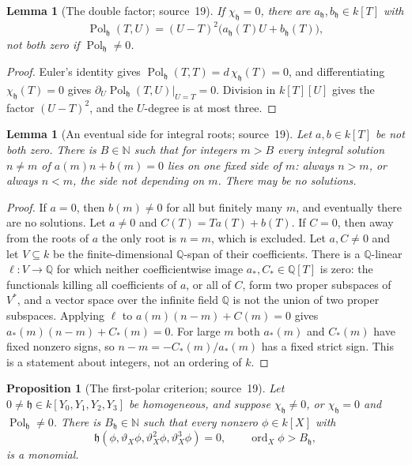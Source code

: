 \documentclass[11pt]{article}
\numberwithin{equation}{section}
\newtheorem{lemma}[theorem]{Lemma}
\newtheorem{proposition}[theorem]{Proposition}
\theoremstyle{definition}
\theoremstyle{remark}
\newcommand{\Q}{\mathbb Q}
\newcommand{\N}{\mathbb N}
\begin{document}
\begin{lemma}[The double factor; source~19]\label{hol:nr:lem:polar}
If $\chi_{\mathfrak h}=0$, there are $a_{\mathfrak h},b_{\mathfrak h}\in k[T]$
with
\begin{equation}\label{hol:nr:eq:polarfactor}
 \operatorname{Pol}_{\mathfrak h}(T,U)=(U-T)^2\bigl(a_{\mathfrak h}(T)U
 +b_{\mathfrak h}(T)\bigr),
\end{equation}
not both zero if $\operatorname{Pol}_{\mathfrak h}\ne0$.
\end{lemma}

\begin{proof}
Euler's identity gives $\operatorname{Pol}_{\mathfrak h}(T,T)=
d\,\chi_{\mathfrak h}(T)=0$, and differentiating $\chi_{\mathfrak h}(T)=0$ gives
$\partial_U\operatorname{Pol}_{\mathfrak h}(T,U)|_{U=T}=0$. Division in
$k[T][U]$ gives the factor $(U-T)^2$, and the $U$-degree is at most three.
\end{proof}

\begin{lemma}[An eventual side for integral roots; source~19]
\label{hol:nr:lem:side}
Let $a,b\in k[T]$ be not both zero. There is $B\in\N$ such that for integers
$m>B$ every integral solution $n\ne m$ of $a(m)n+b(m)=0$ lies on one fixed side
of $m$: always $n>m$, or always $n<m$, the side not depending on $m$. There
may be no solutions.
\end{lemma}

\begin{proof}
If $a=0$, then $b(m)\ne0$ for all but finitely many $m$, and eventually there
are no solutions. Let $a\ne0$ and $C(T)=Ta(T)+b(T)$. If $C=0$, then away from
the roots of $a$ the only root is $n=m$, which is excluded. Let $a,C\ne0$ and
let $V\subseteq k$ be the finite-dimensional $\Q$-span of their coefficients.
There is a $\Q$-linear $\ell:V\to\Q$ for which neither coefficientwise image
$a_*,C_*\in\Q[T]$ is zero: the functionals killing all coefficients of $a$,
or all of $C$, form two proper subspaces of $V^*$, and a vector space over the
infinite field $\Q$ is not the union of two proper subspaces. Applying $\ell$
to $a(m)(n-m)+C(m)=0$ gives $a_*(m)(n-m)+C_*(m)=0$. For large $m$ both
$a_*(m)$ and $C_*(m)$ have fixed nonzero signs, so $n-m=-C_*(m)/a_*(m)$ has a
fixed strict sign. This is a statement about integers, not an ordering of $k$.
\end{proof}

\begin{proposition}[The first-polar criterion; source~19]
\label{hol:nr:prop:firstpolar}
Let $0\ne\mathfrak h\in k[Y_0,Y_1,Y_2,Y_3]$ be homogeneous, and suppose
$\chi_{\mathfrak h}\ne0$, or $\chi_{\mathfrak h}=0$ and
$\operatorname{Pol}_{\mathfrak h}\ne0$. There is $B_{\mathfrak h}\in\N$ such
that every nonzero $\phi\in k[X]$ with
\[
 \mathfrak h(\phi,\vartheta_X\phi,\vartheta_X^2\phi,\vartheta_X^3\phi)=0,
 \qquad \operatorname{ord}_X\phi>B_{\mathfrak h},
\]
is a monomial.
\end{proposition}
\end{document}
